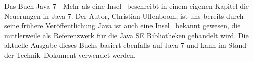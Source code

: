 Das Buch \glqq Java 7 - Mehr als eine Insel\grqq\cite{javainsel2} ~beschreibt in einem eigenen Kapitel die Neuerungen in Java 7. Der Autor, Christian Ullenboom, ist uns bereits durch seine frühere Veröffentlichung \glqq Java ist auch eine Insel\grqq\cite{javainsel1} ~bekannt gewesen, die mittlerweile als Referenzwerk für die Java SE Bibliotheken gehandelt wird. Die aktuelle Ausgabe dieses Buchs basiert ebenfalls auf Java 7 und kann im \glqq Stand der Technik\grqq ~Dokument verwendet werden.
\renewcommand{\arraystretch}{1}
%

